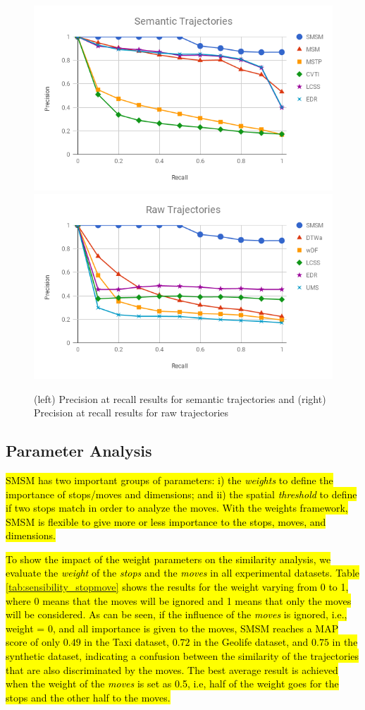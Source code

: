 \documentclass[12pt]{article}
\begin{document}
\begin{figure}[ht!]
\centerline{
\centering
\includegraphics[width=.45\textwidth]{Images/P_R-chart_Hermoupolis_semantic.png}
\includegraphics[width=.45\textwidth]{Images/P_R-chart_Hermoupolis_raw.png}
}
\caption{(left) Precision at recall results for semantic trajectories  and (right) Precision at recall results for raw  trajectories}
\label{fig:hermoupolis_precision_recall}
\end{figure}


 




\subsection{Parameter Analysis}\label{sec:sensitivity}

\hl{SMSM has two important groups of parameters: i) the \emph{weights} to define the importance of stops/moves and dimensions; and ii) the spatial \emph{threshold} to define if two stops match in order to analyze the moves.
With the weights framework, SMSM is flexible to give more or less importance to the stops, moves, and dimensions. 
}

\hl{To show the impact of the weight parameters on the similarity analysis, we evaluate the \emph{weight} of the \emph{stops} and the \emph{moves} in all experimental datasets. Table {\ref{tab:sensibility_stopmove}} shows the results for the weight varying from 0 to 1, where 0 means that the moves will be ignored and 1 means that only the moves will be considered.  As can be seen, if the influence of the \emph{moves} is ignored, i.e., weight = 0, and all importance is given to the moves, SMSM reaches a MAP score of only $0.49$ in the Taxi dataset, $0.72$ in the Geolife dataset, and $0.75$ in the synthetic dataset, indicating a confusion between the similarity of the trajectories that are also discriminated by the moves. The best average result is achieved when the weight of the \emph{moves} is set as 0.5, i.e, half of the weight goes for the stops and the other half to the moves.}
\end{document}
